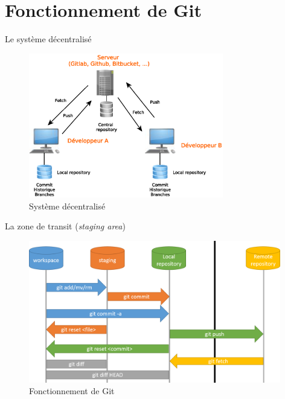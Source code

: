 \documentclass[xcolor=x11names,compress]{beamer}
\begin{document}
\section{Fonctionnement de Git}
\begin{frame}{Le système décentralisé}
	\begin{figure}[H]
		\centering
		\includegraphics[width=8.5cm]{images/1-bases/git-repo.eps}
		\caption{Système décentralisé}
	\end{figure}
\end{frame}

\begin{frame}{La zone de transit (\textit{staging area})}
	\begin{figure}[H]
		\vspace{-10px}
		\includegraphics[width=11cm]{images/1-bases/staging.png}
		\caption{Fonctionnement de Git}
	\end{figure}	
\end{frame}
\end{document}
